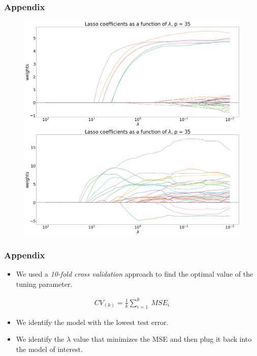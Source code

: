 \begin{frame}[fragile]
    \frametitle{Appendix}
    \begin{figure}[b]
        \includegraphics[scale=0.13]{Img/lasso_plot_betas.png}
        \centering
    \end{figure}
\end{frame}
\begin{frame}[fragile]
    \frametitle{Appendix}
    \begin{itemize}
        \item We used a \textit{10-fold cross validation} approach to find the optimal value of the tuning parameter.
    \end{itemize}
    \begin{align}
    \label{}
    CV_{(k)}=\frac{1}{k}\sum_{i=1}^{k} \: MSE_i
    \end{align}
    \begin{itemize}
        \item We identify the model with the lowest test error.
        \item We identify the $\lambda$ value that minimizes the MSE and then plug it back into the model of interest.
    \end{itemize}
\end{frame}
